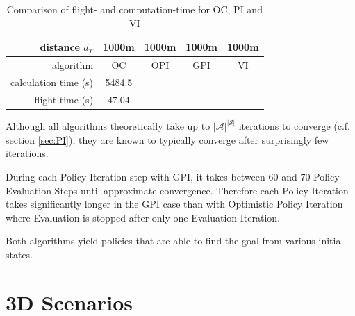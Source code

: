 \begin{table}[h]
	\begin{center}
		\begin{tabular}{r|c c c c}
			distance $d_T$ & 1000m & 1000m & 1000m & 1000m \\ \hline 
			algorithm & OC & OPI & GPI & VI \\
			calculation time (s) & 5484.5& & & \\
			flight time (s) & 47.04 & & &
		\end{tabular}
		\caption{Comparison of flight- and computation-time for OC, PI and VI}
		\label{tab:2d_flighttimes}
	\end{center}
\end{table}

Although all algorithms theoretically take up to $|\mathcal{A}|^{|\mathcal{S}|}$ iterations to converge (c.f. section \ref{sec:PI}), they are known to typically converge after surprisingly few iterations.

During each Policy Iteration step with GPI, it takes between 60 and 70 Policy Evaluation Steps until approximate convergence. Therefore each Policy Iteration takes significantly longer in the GPI case than with Optimistic Policy Iteration where Evaluation is stopped after only one Evaluation Iteration.

Both algorithms yield policies that are able to find the goal from various initial states. 

\section{3D Scenarios}
\label{sec:results3d}